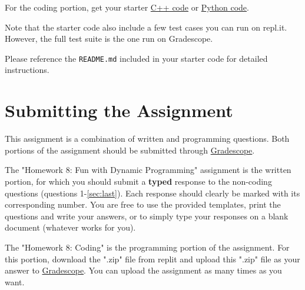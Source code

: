 \documentclass [12pt]{article}
\begin{document}
For the coding portion, get your starter \href{https://replit.com/team/COMP285/HW8-Code}{C++ code} or \href{https://replit.com/team/COMP285/HW8-Code-Python}{Python code}.

Note that the starter code also include a few test cases you can run on repl.it. However, the full test suite is the one run on Gradescope.

Please reference the \texttt{README.md} included in your starter code for detailed instructions.

\section*{Submitting the Assignment}

This assignment is a combination of written and programming questions. Both portions of the assignment should be submitted through \href{https://www.gradescope.com/courses/350304}{Gradescope}.

The "Homework 8: Fun with Dynamic Programming" assignment is the written portion, for which you should submit a \textbf{typed} response to the non-coding questions (questions 1-\ref{sec:last}). Each response should clearly be marked with its corresponding number. You are free to use the provided templates, print the questions and write your answers, or to simply type your responses on a blank document (whatever works for you).

The "Homework 8: Coding" is the programming portion of the assignment. For this portion, download the ".zip" file from replit and upload this ".zip" file as your answer to \href{https://www.gradescope.com/courses/350304}{Gradescope}. You can upload the assignment as many times as you want.
\end{document}
